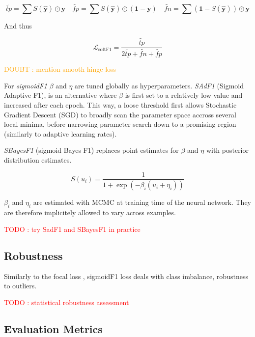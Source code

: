 \documentclass[sigconf,natbib,screen=true,review=true,anonymous]{acmart}
\newcommand\todo[1]{\textcolor{red}{TODO : #1}}
\newcommand\doubt[1]{\textcolor{orange}{DOUBT : #1}}
\begin{document}
$$
\widetilde{tp}=\sum S(\hat{\mathbf{y}}) \odot \mathbf{y} \quad\widetilde{fp}= \sum S(\hat{\mathbf{y}}) \odot (\mathbf{1} - \mathbf{y}) \quad \widetilde{f n}= \sum (\mathbf{1} - S(\hat{\mathbf{y}})) \odot \mathbf{y}
$$

And thus

\begin{equation}
\mathcal{L}_{\text {softF1}}= \frac{\widetilde{tp}}{2 \widetilde{tp}+ \widetilde{fn}+ \widetilde{fp}}
\end{equation}

\doubt{mention smooth hinge loss} \cite{smoothHinge}

For \emph{sigmoidF1} \(\beta\) and \(\eta\) are tuned globally as hyperparameters. \emph{SAdF1} (Sigmoid Adaptive F1), is an alternative where \(\beta\) is first set to a relatively low value and increased after each epoch. This way, a loose threshold first allows Stochastic Gradient Descent (SGD) to broadly scan the parameter space accross several local minima, before narrowing parameter search down to a promising region (similarly to adaptive learning rates).

\emph{SBayesF1} (sigmoid Bayes F1) replaces point estimates for \(\beta\) and \(\eta\) with posterior distribution estimates. 

\begin{equation}
S(u_i) = \frac{1}{1+\exp (-\beta_i (u_i + \eta_i))}
\end{equation}



\(\beta_i\) and \(\eta_i\) are estimated with MCMC at training time of the neural network. They are therefore implicitely allowed to vary across examples.

\todo{try SadF1 and SBayesF1 in practice}


\subsection{Robustness}
\label{sec:org77f76f5}


Similarly to the focal loss \cite{focalLoss}, sigmoidF1 loss deals with class imbalance, robustness to outliers.

\todo{statistical robustness assessment}



\subsection{Evaluation Metrics}
\label{sec:org2e552b1}
\end{document}
